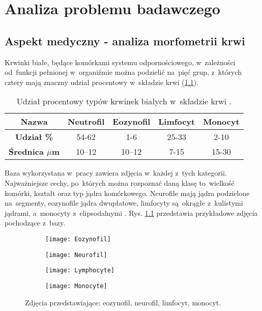 \chapter{Analiza problemu badawczego}
\label{cha:analiza_problemu_badawczego}

\section{Aspekt medyczny - analiza morfometrii krwi}
Krwinki białe, będące komórkami systemu odpornościowego, w~zależności od~funkcji pełnionej w~organiźmie można podzielić na~pięć grup, z~których cztery mają znaczny udział procentowy w~składzie krwi (\ref{tab:blood_cells_percentage}).
\begin{table}[h!]
\centering
\caption[Short Heading]{Udział procentowy typów krwinek białych w~składzie krwi \cite{Wheater1979FunctionalHA}.}
\label{tab:blood_cells_percentage}
\begin{tabular}{|c|c|c|c|c|}
\hline
\textbf{Nazwa}                               & Neutrofil & Eozynofil & Limfocyt & Monocyt \\ \hline
\textbf{Udział \%} & 54-62   & 1-6    & 25-33  & 2-10  \\ \hline
\textbf{Średnica  \textbf{$\mu$}m} & 10–12  & 10–12 & 7-15  & 15-30  \\ \hline
\end{tabular}
\end{table}

{\parindent0pt %
Baza wykorzystana w~pracy zawiera zdjęcia w~każdej z~tych kategorii. Najważniejsze cechy, po~których można rozpoznać daną klasę to~wielkość komórki, kształt oraz typ jądra komórkowego. Neurofile mają jądra podzielone na~segmenty, eozynofile jądra dwupłatowe, limfocyty są~okrągłe z~kulistymi jądrami, a~monocyty z~elipsodalnymi \cite{lymphocytes_nucleus}. Rys. \ref{fig:subcaption_example} przedstawia przykładowe zdjęcia pochodzące z~bazy.
\begin{figure}[h!]
	\centering
	\begin{subfigure}{0.35\textwidth}
		\centering
		\texttt{[image: Eozynofil]}
		\subcaption{\label{subfigure_a}}
	\end{subfigure}
	\begin{subfigure}{0.35\textwidth}
		\centering
		\texttt{[image: Neurofil]}
		\subcaption{\label{subfigure_b}}
	\end{subfigure}
	\begin{subfigure}{0.35\textwidth}
		\centering
		\texttt{[image: Lymphocyte]}
		\subcaption{\label{subfigure_c}}
	\end{subfigure}
	\begin{subfigure}{0.35\textwidth}
		\centering
		\texttt{[image: Monocyte]}
		\subcaption{\label{subfigure_d}}
	\end{subfigure}
	
	\caption{Zdjęcia przedstawiające: \protect{} eozynofil, \protect{} neurofil,  \protect{} limfocyt,  \protect{} monocyt.}
	\label{fig:subcaption_example}
\end{figure}
}
